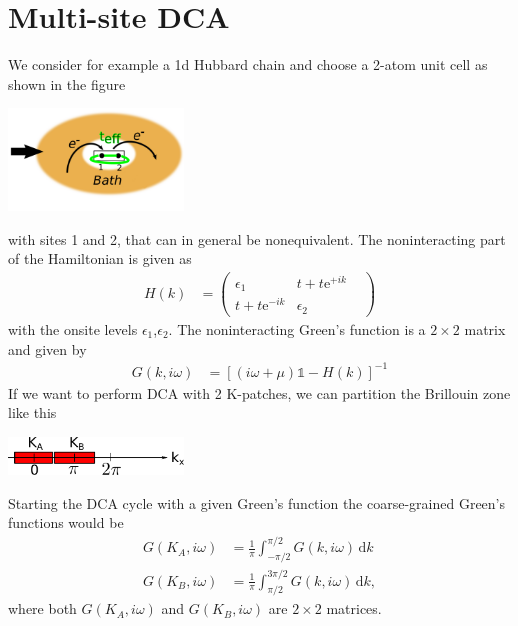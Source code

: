 \documentclass[12pt,a4paper]{scrartcl}
\numberwithin{equation}{section}
\newcommand{\unity}{\mathds{1}}
\begin{document}

\section{Multi-site DCA}
We consider for example a 1d Hubbard chain and choose a 2-atom unit cell as shown in the figure
\begin{center}
\includegraphics[width=0.35\textwidth]{dca/1dchain.png}                                                      
\end{center}
with sites 1 and 2, that can in general be nonequivalent.
The noninteracting part of the Hamiltonian is given as
\begin{align}
 H(k) &= 
 \begin{pmatrix}
  \epsilon_1 & t + t\mathrm{e}^{+ik} \\
   t + t\mathrm{e}^{-ik} & \epsilon_2 & 
 \end{pmatrix}
\end{align}
with the onsite levels $\epsilon_1$,$\epsilon_2$. The noninteracting Green's function is
a $2\times 2$ matrix and given by
\begin{align}
 G(k,i\omega)
 &= [(i\omega+\mu) \unity - H(k)]^{-1}
\end{align}
If we want to perform DCA with 2 K-patches, we can partition the Brillouin zone like this
\begin{center}
\includegraphics[width=0.35\textwidth]{dca/2patch.png}                                                      
\end{center}
Starting the DCA cycle with a given Green's function the coarse-grained Green's functions would be
\begin{align}
 G(K_A,i\omega) &= \frac{1}{\pi} \int_{-\pi/2}^{\pi/2} G(k,i\omega) \, \mathrm{d}k \\
 G(K_B,i\omega) &= \frac{1}{\pi} \int_{\pi/2}^{3\pi/2} G(k,i\omega)\, \mathrm{d}k, \label{eq:DCA_coarseGF}
\end{align}
where both $G(K_A,i\omega)$ and $G(K_B,i\omega)$ are $2\times 2$ matrices.
\end{document}
